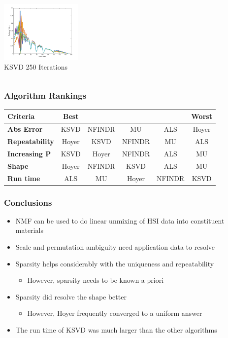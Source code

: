 \documentclass{beamer}
\begin{document}
\begin{frame}
\begin{columns}
\begin{column}{0.33\textwidth}
        \includegraphics[width=4cm,center]{recon_ksvd_250iter}
        \\ KSVD 250 Iterations
        \centering
    \end{column}
\end{columns}

\end{frame}

\begin{frame}
\frametitle{Algorithm Rankings}

\begin{tabular}{| l || c | c | c | c | c |}
\hline
\bf{Criteria} & \bf{Best} & & & & \bf{Worst} \\
\hline
\hline
\bf{Abs Error} & KSVD & NFINDR & MU & ALS & Hoyer \\
\hline
\bf{Repeatability} & Hoyer & KSVD & NFINDR & MU & ALS \\
\hline
\bf{Increasing P} & KSVD & Hoyer & NFINDR & ALS & MU \\
\hline
\bf{Shape} & Hoyer & NFINDR & KSVD & ALS & MU \\
\hline
\bf{Run time} & ALS & MU & Hoyer & NFINDR & KSVD \\
\hline
\end{tabular}

\end{frame}

\begin{frame}
\frametitle{Conclusions}

\begin{itemize}
\item NMF can be used to do linear unmixing of HSI data into constituent materials
\item Scale and permutation ambiguity need application data to resolve
\item Sparsity helps considerably with the uniqueness and repeatability
    \begin{itemize}
        \item However, sparsity needs to be known a-priori
    \end{itemize}
\item Sparsity did resolve the shape better
    \begin{itemize}
        \item However, Hoyer frequently converged to a uniform answer
    \end{itemize}
\item The run time of KSVD was much larger than the other algorithms
\end{itemize}

\end{frame}
\end{document}
